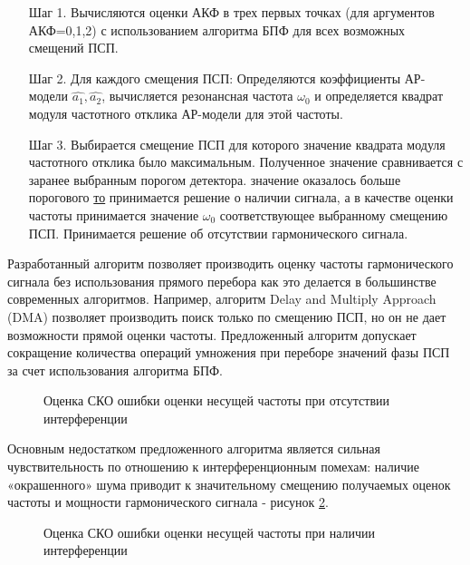 \begin{itemize}
\item[Шаг 1.] Вычисляются оценки  АКФ в трех первых точках (для аргументов АКФ=0,1,2)
	с использованием алгоритма БПФ для всех возможных смещений ПСП. 
\item[Шаг 2.] Для каждого смещения ПСП: 
	Определяются коэффициенты АР-модели ${\hat{a_1}, \hat{a_2}}$,
	вычисляется резонансная частота ${\omega_0}$
	и определяется квадрат модуля частотного отклика АР-модели для этой частоты. 
\item[Шаг 3.] Выбирается смещение ПСП для которого значение квадрата модуля частотного отклика было максимальным. Полученное значение сравнивается с заранее выбранным порогом детектора. 
	  значение оказалось больше порогового {\underline{то}} 
		принимается решение о наличии сигнала, а в качестве оценки
		частоты принимается значение ${\omega_0}$ соответствующее выбранному смещению ПСП. 
		Принимается решение об отсутствии гармонического сигнала.
\end{itemize}

Разработанный алгоритм позволяет производить оценку частоты гармонического сигнала без использования прямого перебора как это делается в большинстве современных алгоритмов.
Например, алгоритм Delay and Multiply Approach (DMA) позволяет производить поиск только по смещению ПСП,
но он не дает возможности прямой оценки частоты. 
Предложенный алгоритм допускает сокращение количества операций умножения при переборе значений фазы ПСП за счет использования алгоритма БПФ.

\begin{figure}[H]
	\center{}
	\caption{Оценка СКО ошибки оценки несущей частоты при отсутствии интерференции}
	\label{pic:ar_cdma1_freq_est1}
\end{figure}

Основным недостатком предложенного алгоритма является сильная чувствительность по отношению к интерференционным помехам: наличие «окрашенного» шума приводит к
значительному смещению получаемых оценок частоты и мощности гармонического сигнала - рисунок \ref{pic:ar_cdma1_freq_est2}.

\begin{figure}[H]
	\center{}
	\caption{Оценка СКО ошибки оценки несущей частоты при наличии интерференции}
	\label{pic:ar_cdma1_freq_est2}
\end{figure}
